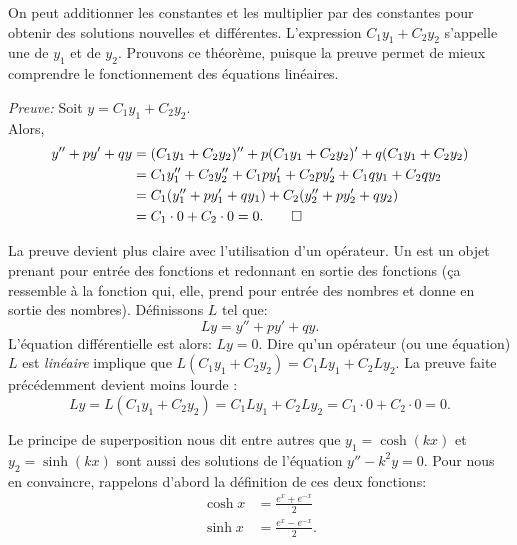 On peut additionner les constantes et les multiplier par des constantes pour obtenir des solutions nouvelles et différentes.  L'expression $C_1 y_1 + C_2 y_2$ s'appelle une
\emph{} de $y_1$ et de $y_2$.
Prouvons ce théorème, puisque la preuve permet de mieux comprendre le fonctionnement des équations linéaires.

\medskip

\emph{Preuve:}
Soit 
$y = C_1 y_1 + C_2 y_2$. \\
Alors,
\begin{align*}
y'' + py' + qy & =	(C_1 y_1 + C_2 y_2)'' + p(C_1 y_1 + C_2 y_2)' + q(C_1 y_1 + C_2 y_2) \\
				& = C_1 y_1'' + C_2 y_2'' + C_1 p y_1' + C_2 p y_2' + C_1 q y_1 + C_2 q y_2 \\
				& = C_1 ( y_1'' + p y_1' + q y_1 ) + C_2 ( y_2'' + p y_2' + q y_2 ) \\
				& = C_1 \cdot 0 + C_2 \cdot 0 = 0 . \qed
\end{align*}

\medskip

La preuve devient plus claire avec l'utilisation d'un opérateur.
Un \emph{} est un objet prenant pour entrée des fonctions et redonnant en sortie des fonctions (ça ressemble à la fonction qui, elle, prend pour entrée des nombres et donne en sortie des nombres).
Définissons $L$ tel que: 
\begin{equation*}
	Ly = y'' + py' + qy .
\end{equation*}
L'équation différentielle est alors: $Ly=0$.
Dire qu'un opérateur (ou une équation)
$L$ est  \emph{linéaire} implique que $L(C_1y_1 + C_2y_2) = 
C_1 Ly_1 + C_2 Ly_2$.  La preuve faite précédemment devient moins lourde :
\begin{equation*}
	Ly = L(C_1y_1 + C_2y_2) = 	C_1 Ly_1 + C_2 Ly_2 = C_1 \cdot 0 + C_2 \cdot 0 = 0 .
\end{equation*}

\medskip

Le principe de superposition nous dit entre autres que $y_1 = \cosh (kx)$ et $y_2 = \sinh (kx)$ sont aussi des solutions de l'équation $y'' - k^2y = 0$.  Pour nous en convaincre, rappelons d'abord la définition de ces deux fonctions:
\begin{align*}
	\cosh x & = \frac{e^x  + e^{-x}}{2} \\
	\sinh x  & = \frac{e^x - e^{-x}}{2}.
\end{align*}

